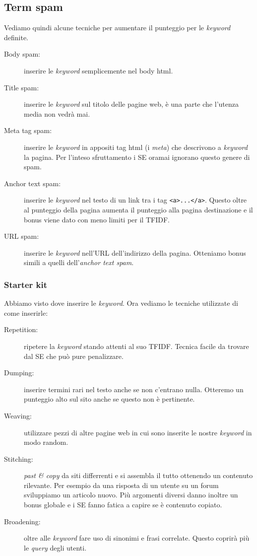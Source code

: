 		\subsection{Term spam}
			Vediamo quindi alcune tecniche per aumentare il punteggio per le \emph{keyword} definite.
			\begin{description}
				\item[Body spam:] inserire le \emph{keyword} semplicemente nel body html.
				\item[Title spam:] inserire le \emph{keyword} sul titolo delle pagine web, è una parte che l'utenza media non vedrà mai.
				\item[Meta tag spam:] inserire le \emph{keyword} in appositi tag html (i \emph{meta}) che descrivono a \emph{keyword} la pagina. Per l'inteso sfruttamento i SE oramai ignorano questo genere di spam.
				\item[Anchor text spam:] inserire le \emph{keyword} nel testo di un link tra i tag \verb|<a>...</a>|. Questo oltre al punteggio della pagina aumenta il punteggio alla pagina destinazione e il bonus viene dato con meno limiti per il TFIDF.
				\item[URL spam:] inserire le \emph{keyword} nell'URL dell'indirizzo della pagina. Otteniamo bonus simili a quelli dell'\emph{anchor text spam}.
			\end{description}
			
		
			\subsubsection{Starter kit}
				Abbiamo visto dove inserire le \emph{keyword}. Ora vediamo le tecniche utilizzate di come inserirle:
				\begin{description}
					\item[Repetition:] ripetere la \emph{keyword} stando attenti al suo TFIDF. Tecnica facile da trovare dal SE che può pure penalizzare.
					\item[Dumping:] inserire termini rari nel testo anche se non c'entrano nulla. Otteremo un punteggio alto sul sito anche se questo non è pertinente.
					\item[Weaving:] utilizzare pezzi di altre pagine web in cui sono inserite le nostre \emph{keyword} in modo random.
					\item[Stitching:] \emph{past \& copy} da siti differrenti e si assembla il tutto ottenendo un contenuto rilevante. Per esempio da una risposta di un utente su un forum sviluppiamo un articolo nuovo. Più argomenti diversi danno inoltre un bonus globale e i SE fanno fatica a capire se è contenuto copiato.
					\item[Broadening:] oltre alle \emph{keyword} fare uso di sinonimi e frasi correlate. Questo coprirà più le \emph{query} degli utenti.
				\end{description}		
		
